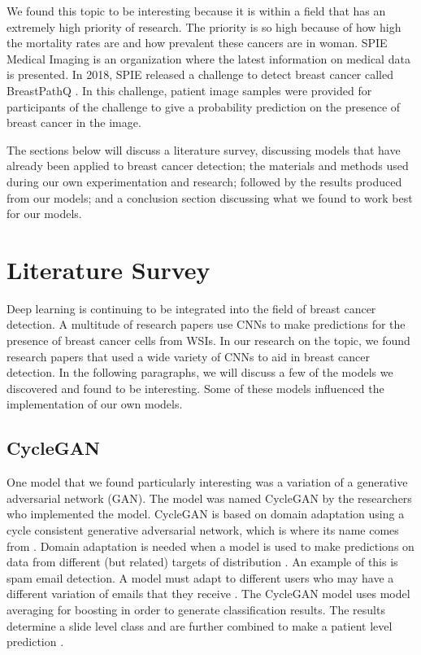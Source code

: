 \documentclass[11pt]{ieeeconf}
\begin{document}
We found this topic to be interesting because it is within a field that has an extremely high priority of research. The priority is so high because of how high the mortality rates are and how prevalent these cancers are in woman. SPIE Medical Imaging is an organization where the latest information on medical data is presented. In 2018, SPIE released a challenge to detect breast cancer called BreastPathQ \cite{spie}. In this challenge, patient image samples were provided for participants of the challenge to give a probability prediction on the presence of breast cancer in the image.

The sections below will discuss a literature survey, discussing models that have already been applied to breast cancer detection; the materials and methods used during our own experimentation and research; followed by the results produced from our models; and a conclusion section discussing what we found to work best for our models.

\section{Literature Survey}
Deep learning is continuing to be integrated into the field of breast cancer detection. A multitude of research papers use CNNs to make predictions for the presence of breast cancer cells from WSIs. In our research on the topic, we found research papers that used a wide variety of CNNs to aid in breast cancer detection. In the following paragraphs, we will discuss a few of the models we discovered and found to be interesting. Some of these models influenced the implementation of our own models.

\subsection{CycleGAN}
One model that we found particularly interesting was a variation of a generative adversarial network (GAN). The model was named CycleGAN by the researchers who implemented the model. CycleGAN is based on domain adaptation using a cycle consistent generative adversarial network, which is where its name comes from \cite{wollmann}. Domain adaptation is needed when a model is used to make predictions on data from different (but related) targets of distribution \cite{web3}. An example of this is spam email detection. A model must adapt to different users who may have a different variation of emails that they receive \cite{web3}. The CycleGAN model uses model averaging for boosting in order to generate classification results. The results determine a slide level class and are further combined to make a patient level prediction \cite{wollmann}.
\end{document}
